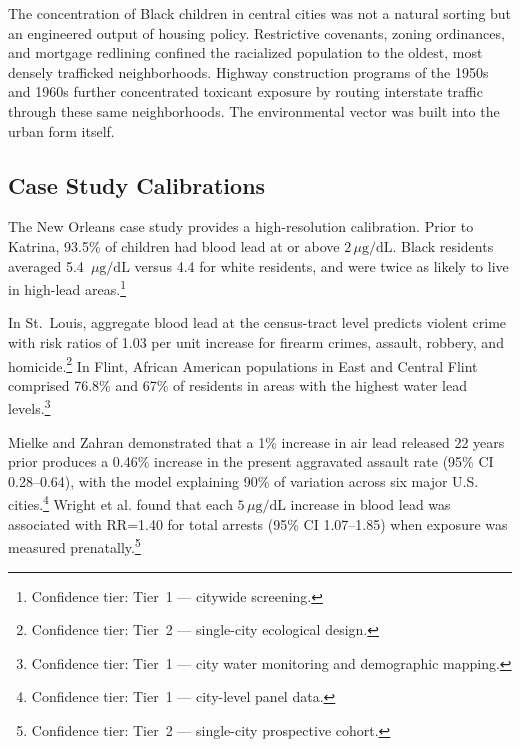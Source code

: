 The concentration of Black children in central cities was not a natural
sorting but an engineered output of housing policy. Restrictive covenants,
zoning ordinances, and mortgage redlining confined the racialized population to
the oldest, most densely trafficked neighborhoods. Highway construction programs
of the 1950s and 1960s further concentrated toxicant exposure by routing
interstate traffic through these same neighborhoods. The environmental vector was
built into the urban form itself.

\subsection{Case Study Calibrations}

The New Orleans case study provides a high-resolution calibration. Prior to
Katrina, 93.5\% of children had blood lead at or above
$2\,\mu\mathrm{g}/\mathrm{dL}$. Black residents averaged
5.4~$\mu\mathrm{g}/\mathrm{dL}$ versus 4.4 for white residents, and were twice
as likely to live in high-lead areas.\footnote{Confidence tier: Tier~1 --- citywide screening.}

In St.~Louis, aggregate blood lead at the census-tract level predicts violent
crime with risk ratios of 1.03 per unit increase for firearm crimes, assault,
robbery, and homicide.\footnote{Confidence tier: Tier~2 --- single-city ecological design.}
In Flint, African American populations in East and Central Flint comprised
76.8\% and 67\% of residents in areas with the highest water lead
levels.\footnote{Confidence tier: Tier~1 --- city water monitoring and
demographic mapping.}

Mielke and Zahran demonstrated that a 1\% increase in air lead released 22
years prior produces a 0.46\% increase in the present aggravated assault rate
(95\% CI 0.28--0.64), with the model explaining 90\% of variation across six
major U.S. cities.\footnote{Confidence tier: Tier~1 --- city-level panel data.}
Wright et al. found that each $5\,\mu\mathrm{g}/\mathrm{dL}$ increase in blood
lead was associated with RR=1.40 for total arrests (95\% CI 1.07--1.85) when
exposure was measured prenatally.\footnote{Confidence tier: Tier~2
--- single-city prospective cohort.}

